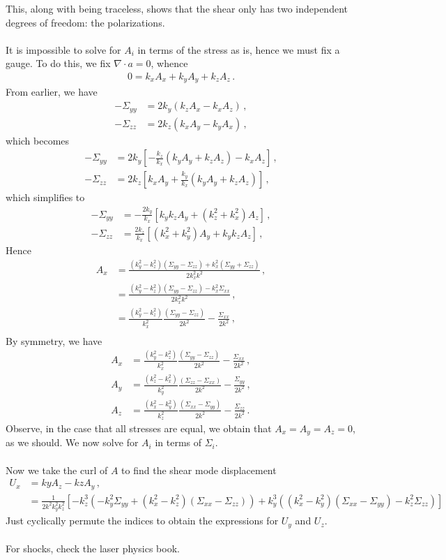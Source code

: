 \documentclass{article}
\newcommand*\p[1]{\left(#1\right)}
\newcommand*\ps[1]{\left[#1\right]}
\newcommand*\f[2]{\frac{#1}{#2}}
\begin{document}
This, along with being traceless, shows that the shear only has two independent degrees of freedom: the polarizations.
\\\\
It is impossible to solve for $A_i$ in terms of the stress as is, hence we must fix a gauge. To do this, we fix $\nabla\cdot a=0$, whence
\begin{align}
0=k_xA_x+k_yA_y+k_zA_z\,.
\end{align}
From earlier, we have
\begin{align}
-\Sigma_{yy}&=2k_y(k_z A_x-k_x A_z)\,,\\
-\Sigma_{zz}&=2k_z(k_x A_y-k_y A_x)\,,
\end{align}
which becomes
\begin{align}
-\Sigma_{yy}&=2k_y\ps{-\f{k_z}{k_x} \p{k_yA_y+k_zA_z}-k_x A_z}\,,\\
-\Sigma_{zz}&=2k_z\ps{k_x A_y+\f{k_y}{k_x} \p{k_yA_y+k_zA_z}}\,,
\end{align}
which simplifies to
\begin{align}
-\Sigma_{yy}&=-\f{2k_y}{k_x}\ps{k_y k_z A_y+\p{k_z^2+k_x^2} A_z}\,,\\
-\Sigma_{zz}&=\f{2k_z}{k_x}\ps{\p{k_x^2 + k_y^2}A_y+k_yk_zA_z}\,,
\end{align}
Hence
\begin{align}
A_x&=\f{(k_y^2-k_z^2)(\Sigma_{yy}-\Sigma_{zz})+k_x^2(\Sigma_{yy}+\Sigma_{zz})}{2k_x^2k^2}\,,\\
&=\f{(k_y^2-k_z^2)(\Sigma_{yy}-\Sigma_{zz})-k_x^2\Sigma_{xx}}{2k_x^2k^2}\,,\\
&=\f{(k_y^2-k_z^2)}{k_x^2}\f{(\Sigma_{yy}-\Sigma_{zz})}{2k^2}-\f{\Sigma_{xx}}{2k^2}\,,\\
\end{align}
By symmetry, we have
\begin{align}
A_x&=\f{(k_y^2-k_z^2)}{k_x^2}\f{(\Sigma_{yy}-\Sigma_{zz})}{2k^2}-\f{\Sigma_{xx}}{2k^2}\,,\\
A_y&=\f{(k_z^2-k_x^2)}{k_y^2}\f{(\Sigma_{zz}-\Sigma_{xx})}{2k^2}-\f{\Sigma_{yy}}{2k^2}\,,\\
A_z&=\f{(k_x^2-k_y^2)}{k_z^2}\f{(\Sigma_{xx}-\Sigma_{yy})}{2k^2}-\f{\Sigma_{zz}}{2k^2}\,.
\end{align}
Observe, in the case that all stresses are equal, we obtain that $A_x=A_y=A_z=0$, as we should.
We now solve for $A_i$ in terms of $\Sigma_{i}$.
\\\\
Now we take the curl of $A$ to find the shear mode displacement
\begin{align}
U_x&=ky A_z-kz A_y\,,\\
&=\f{1}{2k^2k_y^2k_z^2}\ps{-k_z^3\p{-k_y^2\Sigma_{yy}+(k_x^2-k_z^2)(\Sigma_{xx}-\Sigma_{zz})}+k_y^3\p{(k_x^2-k_y^2)(\Sigma_{xx}-\Sigma_{yy})-k_z^2\Sigma_{zz}}}
\end{align}
Just cyclically permute the indices to obtain the expressions for $U_y$ and $U_z$.
\\\\
For shocks, check the laser physics book.
\end{document}
